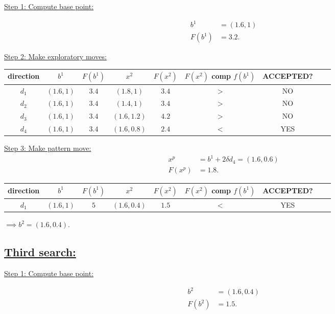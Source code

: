 \documentclass{article}
\begin{document}
\underline{Step 1: Compute base point:}

\begin{align*}
  b^1    &= (1.6, 1) \\
  F(b^1) &= 3.2.
\end{align*}
\newline

\underline{Step 2: Make exploratory moves:}
\newline

\begin{tabular}{ |c|c|c|c|c|c|c|c|c| }
\hline
direction & $b^1$ & $F(b^1)$ & $x^2$ & $F(x^2)$ & $F(x^2)$ \: comp \: $f(b^1)$ & ACCEPTED? \\ 
\hline
$d_1$ & $(1.6, 1)$ & $3.4$ & $(1.8, 1)$ & $3.4$ & $>$ & NO \\ 
\hline
$d_2$ & $(1.6, 1)$ & $3.4$ & $(1.4, 1)$ & $3.4$ & $>$ & NO \\ 
\hline
$d_3$ & $(1.6, 1)$ & $3.4$ & $(1.6, 1.2)$ & $4.2$ & $>$ & NO \\ 
\hline
$d_4$ & $(1.6, 1)$ & $3.4$ & $(1.6, 0.8)$ & $2.4$ & $<$ & YES \\ 
\hline
\end{tabular}
\newline

\underline{Step 3: Make pattern move:}
\begin{align*}
  x^p &= b^1 + 2 \delta d_4 = (1.6, 0.6) \\
  F(x^p) & = 1.8.
\end{align*}

\begin{tabular}{ |c|c|c|c|c|c|c|c|c| }
\hline
direction & $b^1$ & $F(b^1)$ & $x^2$ & $F(x^2)$ & $F(x^2)$ \: comp \: $f(b^1)$ & ACCEPTED? \\ 
\hline
$d_1$ & $(1.6, 1)$ & $5$ & $(1.6, 0.4)$ & $1.5$ & $<$ & YES \\ 
\hline
\end{tabular}
\newline

$\implies b^2 = (1.6, 0.4)$.
\newline

\subsection*{\underline{Third search:}}

\underline{Step 1: Compute base point:}

\begin{align*}
  b^2    &= (1.6, 0.4) \\
  F(b^2) &= 1.5.
\end{align*}
\newline
\end{document}
